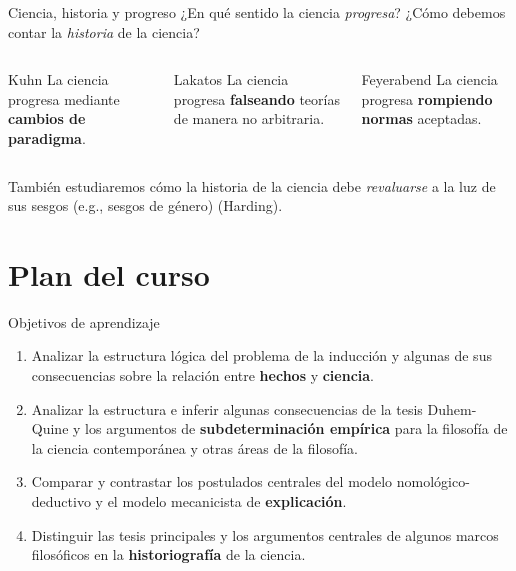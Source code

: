 \documentclass[%
            9pt,
                spanish, %
                    ignorenonframetext,
                aspectratio=169, %
        ]{beamer}
\providecommand{\tightlist}{}
\begin{document}
\begin{frame}{Ciencia, historia y progreso}
\protect{}\label{ciencia-historia-y-progreso}
¿En qué sentido la ciencia \emph{progresa}? ¿Cómo debemos contar la
\emph{historia} de la ciencia? \vspace{-1em}

\begin{columns}[T,onlytextwidth]
\begin{column}{0.3\linewidth}
\begin{block}{Kuhn}
\protect{}\label{kuhn}
La ciencia progresa mediante \textbf{cambios de paradigma}.
\end{block}
\end{column}

\begin{column}{0.3\linewidth}
\begin{block}{Lakatos}
\protect{}\label{lakatos}
La ciencia progresa \textbf{falseando} teorías de manera no arbitraria.
\end{block}
\end{column}

\begin{column}{0.3\linewidth}
\begin{block}{Feyerabend}
\protect{}\label{feyerabend}
La ciencia progresa \textbf{rompiendo normas} aceptadas.
\end{block}
\end{column}
\end{columns}

\vspace{1em}

También estudiaremos cómo la historia de la ciencia debe
\emph{revaluarse} a la luz de sus sesgos (e.g., sesgos de género)
(Harding).
\end{frame}

\section{Plan del curso}\label{plan-del-curso}

\begin{frame}{Objetivos de aprendizaje}
\protect{}\label{objetivos-de-aprendizaje}
\begin{enumerate}
\tightlist
\item
  Analizar la estructura lógica del problema de la inducción y algunas
  de sus consecuencias sobre la relación entre \textbf{hechos} y
  \textbf{ciencia}.
\item
  Analizar la estructura e inferir algunas consecuencias de la tesis
  Duhem-Quine y los argumentos de \textbf{subdeterminación empírica}
  para la filosofía de la ciencia contemporánea y otras áreas de la
  filosofía.
\item
  Comparar y contrastar los postulados centrales del modelo
  nomológico-deductivo y el modelo mecanicista de \textbf{explicación}.
\item
  Distinguir las tesis principales y los argumentos centrales de algunos
  marcos filosóficos en la \textbf{historiografía} de la ciencia.
\end{enumerate}
\end{frame}
\end{document}
